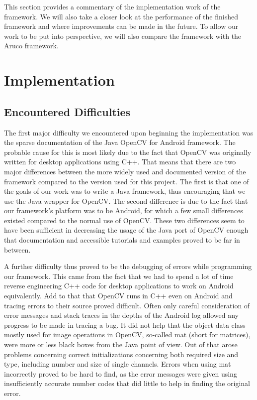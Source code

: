 This section provides a commentary of the implementation work of the framework.
We will also take a closer look at the performance of the finished framework and where improvements can be made in the future.
To allow our work to be put into perspective, we will also compare the framework with the Aruco framework.

\section{Implementation}
\label{implementation}

\subsection{Encountered Difficulties}

The first major difficulty we encountered upon beginning the implementation was the sparse documentation of the Java OpenCV for Android framework.
The probable cause for this is most likely due to the fact that OpenCV was originally written for desktop applications using C++.
That means that there are two major differences between the more widely used and documented version of the framework compared to the version used for this project.
The first is that one of the goals of our work was to write a Java framework, thus encouraging that we use the Java wrapper for OpenCV.
The second difference is due to the fact that our framework's platform was to be Android, for which a few small differences existed compared to the normal use of OpenCV.
These two differences seem to have been sufficient in decreasing the usage of the Java port of OpenCV enough that documentation and accessible tutorials and examples proved to be far in between.

A further difficulty thus proved to be the debugging of errors while programming our framework.
This came from the fact that we had to spend a lot of time reverse engineering C++ code for desktop applications to work on Android equivalently.
Add to that that OpenCV runs in C++ even on Android and tracing errors to their source proved difficult.
Often only careful consideration of error messages and stack traces in the depths of the Android log allowed any progress to be made in tracing a bug.
It did not help that the object data class mostly used for image operations in OpenCV, so-called mat (short for matrices), were more or less black boxes from the Java point of view.
Out of that arose problems concerning correct initializations concerning both required size and type, including number and size of single channels.
Errors when using mat incorrectly proved to be hard to find, as the error messages were given using insufficiently accurate number codes that did little to help in finding the original error.

